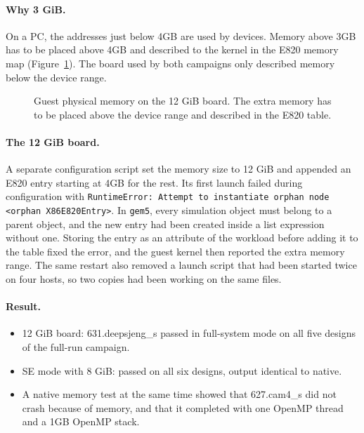 \paragraph{Why 3 GiB.} On a PC, the addresses just below 4GB are used by devices. Memory above 3GB has to be placed above 4GB and described to the kernel in the E820 memory map (Figure~\ref{fig:chr_e820}). The board used by both campaigns only described memory below the device range.

\begin{figure}[htbp]
\centering
{}
\caption{Guest physical memory on the 12 GiB board. The extra memory has to be placed above the device range and described in the E820 table.}
\label{fig:chr_e820}
\end{figure}

\paragraph{The 12 GiB board.} A separate configuration script set the memory size to 12 GiB and appended an E820 entry starting at 4GB for the rest. Its first launch failed during configuration with \texttt{RuntimeError: Attempt to instantiate orphan node <orphan X86E820Entry>}. In \texttt{gem5}, every simulation object must belong to a parent object, and the new entry had been created inside a list expression without one. Storing the entry as an attribute of the workload before adding it to the table fixed the error, and the guest kernel then reported the extra memory range. The same restart also removed a launch script that had been started twice on four hosts, so two copies had been working on the same files.

\paragraph{Result.}
\begin{itemize}
    \item 12 GiB board: 631.deepsjeng\_s passed in full-system mode on all five designs of the full-run campaign.
    \item SE mode with 8 GiB: passed on all six designs, output identical to native.
    \item A native memory test at the same time showed that 627.cam4\_s did not crash because of memory, and that it completed with one OpenMP thread and a 1GB OpenMP stack.
\end{itemize}


